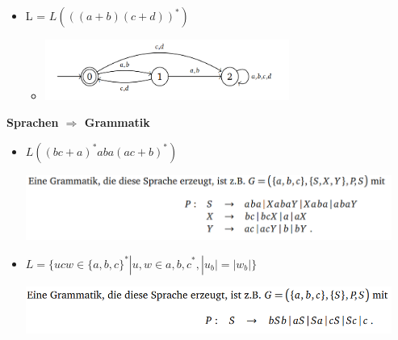 \documentclass[11pt,a4paper]{article}
\begin{document}
\begin{itemize}
\item L = $L(((a+b)(c+d))^*)$
	\begin{itemize}
	\item[]
		\begin{center}
		\includegraphics[width=8cm]{auto7}
		\end{center}	
	\end{itemize}

\end{itemize}

\pagebreak

{\Large \textbf{Sprachen $\Rightarrow$ Grammatik}
\begin{itemize}

\item $L((bc + a)^*aba(ac+b)^*)$
\begin{center}
\includegraphics[width=12cm]{gram1}
\end{center}

\item $L=\{ucw \in \{a,b,c\}^* | u,w \in {a,b,c}^*, |u_b| = |w_b|\}$
\begin{center}
\includegraphics[width=12cm]{gram2}
\end{center}


\end{itemize}}
\end{document}
